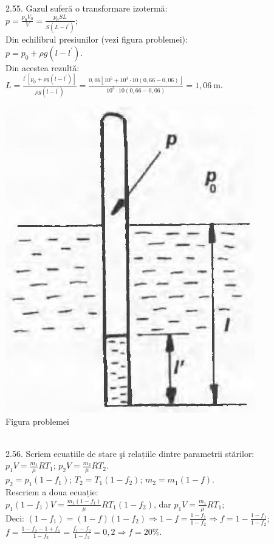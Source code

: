 2.55. Gazul suferă o transformare izotermă:\\ $p=\frac{p_{0} V_{0}}{V}=\frac{p_{0} S L}{S\left(L-l^{\prime}\right)}$;\\ Din echilibrul presiunilor (vezi figura problemei):\\ $p=p_{0}+\rho g\left(l-l^{\prime}\right)$.\\ Din acestea rezultă:\\ $L=\frac{l^{\prime}\left[p_{0}+\rho g\left(l-l^{\prime}\right)\right]}{\rho g\left(l-l^{\prime}\right)}=\frac{0,06\left\lfloor 10^{5}+10^{3} \cdot 10(0,66-0,06)\right\rfloor}{10^{3} \cdot 10(0,66-0,06)}=1,06 \mathrm{~m}$.\\ \begin{center} \includegraphics[width=0.4\linewidth]{images/2025_07_01_5b3ff9fa0d508c8e9f17g-281}\\ Figura problemei \end{center}\\

2.56. Scriem ecuațiile de stare şi relațiile dintre parametrii stărilor:\\ $p_{1} V=\frac{m_{1}}{\mu} R T_{1}$; \quad $p_{2} V=\frac{m_{2}}{\mu} R T_{2}$.\\ $p_{2}=p_{1}\left(1-f_{1}\right)$; \quad $T_{2}=T_{1}\left(1-f_{2}\right)$; \quad $m_{2}=m_{1}(1-f)$.\\ Rescriem a doua ecuație:\\ $p_{1}\left(1-f_{1}\right) V=\frac{m_{1}\left(1-f_{1}\right)}{\mu} R T_{1}\left(1-f_{2}\right)$, dar $p_{1} V=\frac{m_{1}}{\mu} R T_{1}$;\\ Deci: $\left(1-f_{1}\right)=(1-f)\left(1-f_{2}\right) \Rightarrow 1-f=\frac{1-f_{1}}{1-f_{2}} \Rightarrow f=1-\frac{1-f_{1}}{1-f_{2}}$;\\ $f=\frac{1-f_{2}-1+f_{1}}{1-f_{2}}=\frac{f_{1}-f_{2}}{1-f_{2}}=0,2 \Rightarrow f=20 \%$.\\

